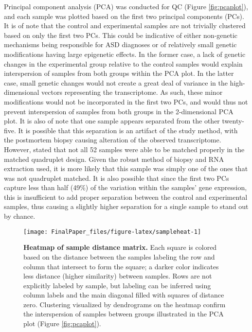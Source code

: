 Principal component analysis (PCA) was conducted for QC (Figure
\ref{fig:pcaplot}), and each sample was plotted based on the first two
principal components (PCs). It is of note that the control and
experimental samples are not trivially clustered based on only the first
two PCs. This could be indicative of either non-genetic mechanisms being
responsible for ASD diagnoses or of relatively small genetic
modifications having large epigenetic effects. In the former case, a lack
of genetic changes in the experimental group relative to the control
samples would explain interspersion of samples from both groups within
the PCA plot. In the latter case, small genetic changes would not create
a great deal of variance in the high-dimensional vectors representing
the transcriptome. As such, these minor modifications would not be
incorporated in the first two PCs, and would thus not prevent
interspersion of samples from both groups in the 2-dimensional PCA plot.
It is also of note that one sample appears separated from the other
twenty-five. It is possible that this separation is an artifact of the
study method, with the postmortem biopsy causing alteration of the
observed transcriptome. However, \citet{orig-paper} stated that not all
52 samples were able to be matched properly in the matched quadruplet
design. Given the robust method of biopsy and RNA extraction used, it is
more likely that this sample was simply one of the ones that was not
quadruplet matched. It is also possible that since the first two PCs
capture less than half (49\%) of the variation within the samples' gene
expression, this is insufficient to add proper separation between the
control and experimental samples, thus causing a slightly higher
separation for a single sample to stand out by chance.

\begin{Schunk}
\begin{figure}
\texttt{[image: FinalPaper\_files/figure-latex/sampleheat-1]} \caption{\label{fig:sampleheat}\textbf{Heatmap of sample distance matrix.} Each square is colored based on the distance between the samples labeling the row and column that intersect to form the square; a darker color indicates less distance (higher similarity) between samples. Rows are not explicitly labeled by sample, but labeling can be inferred using column labels and the main diagonal filled with squares of distance zero. Clustering visualized by dendrograms on the heatmap confirm the interspersion of samples between groups illustrated in the PCA plot (Figure \ref{fig:pcaplot}).}\label{fig:sampleheat}
\end{figure}
\end{Schunk}


